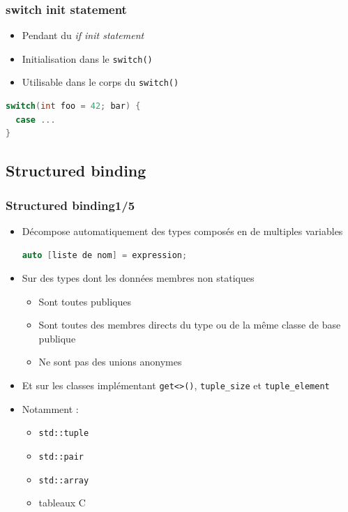 \documentclass[C++.tex]{subfiles}
\begin{document}
\begin{frame}[fragile]
	\frametitle{switch init statement}
	\begin{itemize}
		\item Pendant du \textit{if init statement}
		\item Initialisation dans le \lstinline|switch()|
		\item Utilisable dans le corps du \lstinline|switch()|
	\end{itemize}

	\begin{lstlisting}[language=C++]
switch(int foo = 42; bar) {
  case ...
}\end{lstlisting}
\end{frame}

\subsection*{Structured binding}
\begin{frame}[fragile]
	\frametitle{Structured binding\titlehfill{}1/5}
	\begin{itemize}
		\item Décompose automatiquement des types composés en de multiples variables

		\begin{lstlisting}[language=C++]
auto [liste de nom] = expression;\end{lstlisting}

		\item Sur des types dont les données membres non statiques
		\begin{itemize}
			\item Sont toutes publiques
			\item Sont toutes des membres directs du type ou de la même classe de base publique
			\item Ne sont pas des unions anonymes
		\end{itemize}

		\item Et sur les classes implémentant \lstinline|get<>()|, \lstinline|tuple_size| et \lstinline|tuple_element|	
		
		\item Notamment : 
		\begin{itemize}
			\item \lstinline|std::tuple|
			\item \lstinline|std::pair|
			\item \lstinline|std::array|
			\item tableaux C
		\end{itemize}
	\end{itemize}
\end{frame}
\end{document}
